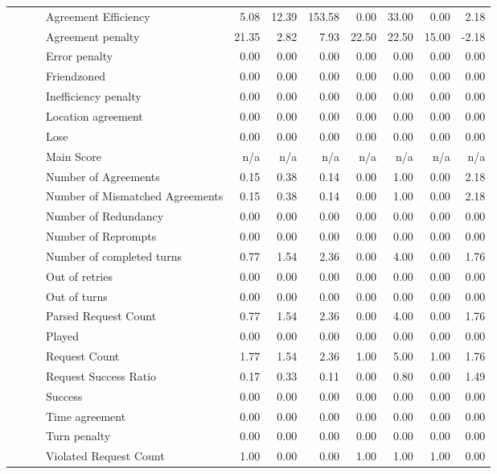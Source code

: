 \begin{tabular}{llllrrrrrrr}
 &  &  & Agreement Efficiency & 5.08 & 12.39 & 153.58 & 0.00 & 33.00 & 0.00 & 2.18 \\
 &  &  & Agreement penalty & 21.35 & 2.82 & 7.93 & 22.50 & 22.50 & 15.00 & -2.18 \\
 &  &  & Error penalty & 0.00 & 0.00 & 0.00 & 0.00 & 0.00 & 0.00 & 0.00 \\
 &  &  & Friendzoned & 0.00 & 0.00 & 0.00 & 0.00 & 0.00 & 0.00 & 0.00 \\
 &  &  & Inefficiency penalty & 0.00 & 0.00 & 0.00 & 0.00 & 0.00 & 0.00 & 0.00 \\
 &  &  & Location agreement & 0.00 & 0.00 & 0.00 & 0.00 & 0.00 & 0.00 & 0.00 \\
 &  &  & Lose & 0.00 & 0.00 & 0.00 & 0.00 & 0.00 & 0.00 & 0.00 \\
 &  &  & Main Score & n/a & n/a & n/a & n/a & n/a & n/a & n/a \\
 &  &  & Number of Agreements & 0.15 & 0.38 & 0.14 & 0.00 & 1.00 & 0.00 & 2.18 \\
 &  &  & Number of Mismatched Agreements & 0.15 & 0.38 & 0.14 & 0.00 & 1.00 & 0.00 & 2.18 \\
 &  &  & Number of Redundancy & 0.00 & 0.00 & 0.00 & 0.00 & 0.00 & 0.00 & 0.00 \\
 &  &  & Number of Reprompts & 0.00 & 0.00 & 0.00 & 0.00 & 0.00 & 0.00 & 0.00 \\
 &  &  & Number of completed turns & 0.77 & 1.54 & 2.36 & 0.00 & 4.00 & 0.00 & 1.76 \\
 &  &  & Out of retries & 0.00 & 0.00 & 0.00 & 0.00 & 0.00 & 0.00 & 0.00 \\
 &  &  & Out of turns & 0.00 & 0.00 & 0.00 & 0.00 & 0.00 & 0.00 & 0.00 \\
 &  &  & Parsed Request Count & 0.77 & 1.54 & 2.36 & 0.00 & 4.00 & 0.00 & 1.76 \\
 &  &  & Played & 0.00 & 0.00 & 0.00 & 0.00 & 0.00 & 0.00 & 0.00 \\
 &  &  & Request Count & 1.77 & 1.54 & 2.36 & 1.00 & 5.00 & 1.00 & 1.76 \\
 &  &  & Request Success Ratio & 0.17 & 0.33 & 0.11 & 0.00 & 0.80 & 0.00 & 1.49 \\
 &  &  & Success & 0.00 & 0.00 & 0.00 & 0.00 & 0.00 & 0.00 & 0.00 \\
 &  &  & Time agreement & 0.00 & 0.00 & 0.00 & 0.00 & 0.00 & 0.00 & 0.00 \\
 &  &  & Turn penalty & 0.00 & 0.00 & 0.00 & 0.00 & 0.00 & 0.00 & 0.00 \\
 &  &  & Violated Request Count & 1.00 & 0.00 & 0.00 & 1.00 & 1.00 & 1.00 & 0.00 \\

\end{tabular}
